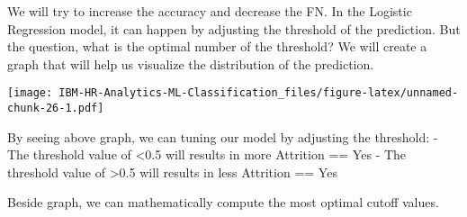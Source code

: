 \documentclass[
]{article}
\newenvironment{Shaded}{\begin{snugshade}}{\end{snugshade}}
\newcommand{\CommentTok}[1]{\textcolor[rgb]{0.56,0.35,0.01}{\textit{#1}}}
\newcommand{\DataTypeTok}[1]{\textcolor[rgb]{0.13,0.29,0.53}{#1}}
\newcommand{\DecValTok}[1]{\textcolor[rgb]{0.00,0.00,0.81}{#1}}
\newcommand{\FloatTok}[1]{\textcolor[rgb]{0.00,0.00,0.81}{#1}}
\newcommand{\KeywordTok}[1]{\textcolor[rgb]{0.13,0.29,0.53}{\textbf{#1}}}
\newcommand{\NormalTok}[1]{#1}
\newcommand{\OperatorTok}[1]{\textcolor[rgb]{0.81,0.36,0.00}{\textbf{#1}}}
\newcommand{\OtherTok}[1]{\textcolor[rgb]{0.56,0.35,0.01}{#1}}
\newcommand{\StringTok}[1]{\textcolor[rgb]{0.31,0.60,0.02}{#1}}
\begin{document}
We will try to increase the accuracy and decrease the FN. In the
Logistic Regression model, it can happen by adjusting the threshold of
the prediction. But the question, what is the optimal number of the
threshold? We will create a graph that will help us visualize the
distribution of the prediction.

\begin{Shaded}
\end{Shaded}

\texttt{[image: IBM-HR-Analytics-ML-Classification\_files/figure-latex/unnamed-chunk-26-1.pdf]}

By seeing above graph, we can tuning our model by adjusting the
threshold: - The threshold value of \textless0.5 will results in more
Attrition == Yes - The threshold value of \textgreater0.5 will results
in less Attrition == Yes

Beside graph, we can mathematically compute the most optimal cutoff
values.

\begin{Shaded}
\end{Shaded}
\end{document}
